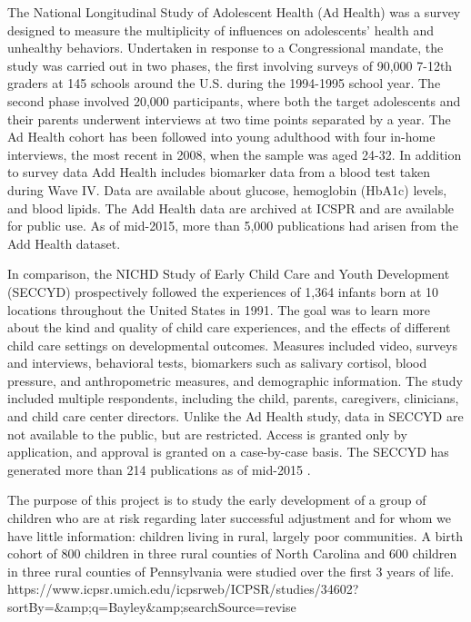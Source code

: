 \documentclass[letterpaper,man,apacite]{apa6}
\begin{document}
The National Longitudinal Study of Adolescent Health (Ad Health) \cite{adolescent_health} was a survey designed to measure the multiplicity of influences on adolescents' health and unhealthy behaviors. 
Undertaken in response to a Congressional mandate, the study was carried out in two phases, the first involving surveys of 90,000 7-12th graders at 145 schools around the U.S. during the 1994-1995 school year. 
The second phase involved 20,000 participants, where both the target adolescents and their parents underwent interviews at two time points separated by a year. 
The Ad Health cohort has been followed into young adulthood with four in-home interviews, the most recent in 2008, when the sample was aged 24-32. 
In addition to survey data Add Health includes biomarker data from a blood test taken during Wave IV. 
Data are available about glucose, hemoglobin (HbA1c) levels, and blood lipids. 
The Add Health data \cite{harris_add_health} are archived at ICSPR \cite{ICPSR} and are available for public use.
As of mid-2015, more than 5,000 publications \cite{add_health_publications} had arisen from the Add Health dataset.

In comparison, the NICHD Study of Early Child Care and Youth Development (SECCYD) prospectively followed the experiences of 1,364 infants born at 10 locations throughout the United States in 1991.
The goal was to learn more about the kind and quality of child care experiences, and the effects of different child care settings on developmental outcomes. 
Measures included video, surveys and interviews, behavioral tests, biomarkers such as salivary cortisol, blood pressure, and anthropometric measures, and demographic information.
The study included multiple respondents, including the child, parents, caregivers, clinicians, and child care center directors.
Unlike the Ad Health study, data in SECCYD are not available to the public, but are restricted.
Access is granted only by application, and approval is granted on a case-by-case basis.
The SECCYD has generated more than 214 publications as of mid-2015 \cite{seccyd_publications}.

The purpose of this project is to study the early development of a group of children who are at risk regarding later successful adjustment and for whom we have little information: children living in rural, largely poor communities. 
A birth cohort of 800 children in three rural counties of North Carolina and 600 children in three rural counties of Pennsylvania were studied over the first 3 years of life.
https://www.icpsr.umich.edu/icpsrweb/ICPSR/studies/34602?sortBy=&amp;q=Bayley&amp;searchSource=revise
\end{document}

